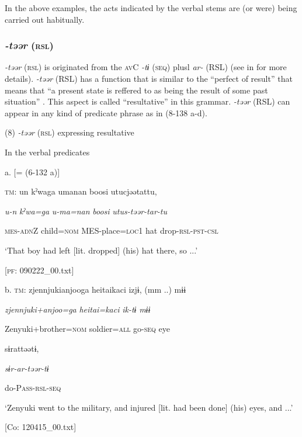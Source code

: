In the above examples, the acts indicated by the verbal stems are (or were) being carried out habitually.

\subsubsection{\textit{{}-təər} (\textsc{rsl})}

\textit{{}-təər} (\textsc{rsl}) is originated from the \textsc{av}C \textit{{}-tɨ} (\textsc{seq}) plusl \textit{ar-} (RSL) (see  in  for more details). \textit{{}-təər} (RSL) has a function that is similar to the “perfect of result” that means that “a present state is reffered to as being the result of some past situation” \citep[56]{Comrie1976}. This aspect is called “resultative” in this grammar. \textit{{}-təər} (RSL) can appear in any kind of predicate phrase as in (8-138 a-d).

(8)  \textit{{}-təər} (\textsc{rsl}) expressing resultative

  In the verbal predicates

  a.  [= (6-132 a)]

    \textsc{tm}:  un  kˀwaga  umanan  {\textbar}boosi{\textbar}  utucjəətattu,

      \textit{u-n}  \textit{kˀwa=ga}  \textit{u-ma=nan}  \textit{boosi}  \textit{utus-təər{}-tar-tu}

      \textsc{mes}-\textsc{adn}Z  child=\textsc{nom}  MES-place=\textsc{loc}1  hat  drop-\textsc{rsl}-\textsc{pst}-\textsc{csl}

      ‘That boy had left [lit. dropped] (his) hat there, so ...’

      [\textsc{pf}: 090222\_00.txt]

  b.  \textsc{tm}:  zjennjukianjooga  {\textbar}heitai{\textbar}kaci  izjɨ,  (mm ..)  mɨɨ

      \textit{zjennjuki+anjoo=ga}  \textit{heitai=kaci}  \textit{ik-tɨ}    \textit{mɨɨ}

      Zenyuki+brother=\textsc{nom}  soldier=\textsc{all}  go-\textsc{seq}    eye

      sɨrattəətɨ,        

      \textit{sɨr-ar-təər{}-tɨ}       

      do-P\textsc{ass}-\textsc{rsl}-\textsc{seq}

      ‘Zenyuki went to the military, and injured [lit. had been done] (his) eyes, and ...’

      [Co: 120415\_00.txt]


